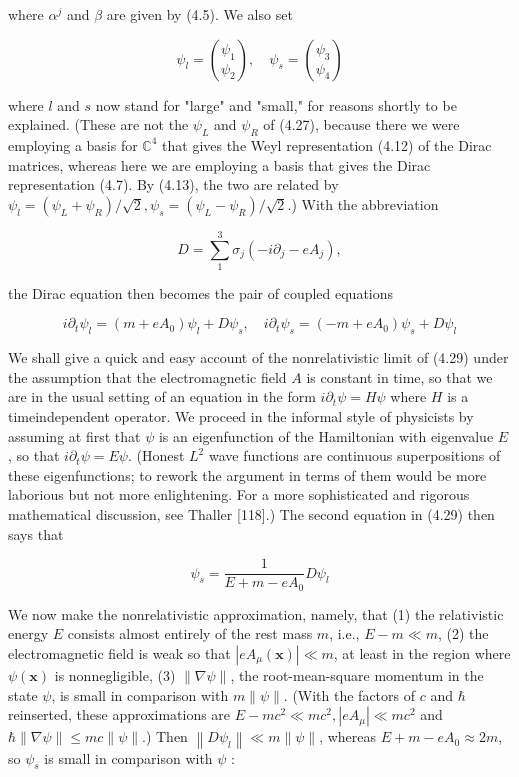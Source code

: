\documentclass[10pt, letterpaper]{article}
\begin{document}
where $\alpha^{j}$ and $\beta$ are given by (4.5). We also set

$$
\psi_{l}=\binom{\psi_{1}}{\psi_{2}}, \quad \psi_{s}=\binom{\psi_{3}}{\psi_{4}}
$$

where $l$ and $s$ now stand for "large" and "small," for reasons shortly to be explained. (These are not the $\psi_{L}$ and $\psi_{R}$ of (4.27), because there we were employing a basis for $\mathbb{C}^{4}$ that gives the Weyl representation (4.12) of the Dirac matrices, whereas here we are employing a basis that gives the Dirac representation (4.7). By (4.13), the two are related by $\psi_{l}=\left(\psi_{L}+\psi_{R}\right) / \sqrt{2}, \psi_{s}=\left(\psi_{L}-\psi_{R}\right) / \sqrt{2}$.) With the abbreviation

$$
D=\sum_{1}^{3} \sigma_{j}\left(-i \partial_{j}-e A_{j}\right),
$$

the Dirac equation then becomes the pair of coupled equations

$$
i \partial_{t} \psi_{l}=\left(m+e A_{0}\right) \psi_{l}+D \psi_{s}, \quad i \partial_{t} \psi_{s}=\left(-m+e A_{0}\right) \psi_{s}+D \psi_{l}
$$

We shall give a quick and easy account of the nonrelativistic limit of (4.29) under the assumption that the electromagnetic field $A$ is constant in time, so that we are in the usual setting of an equation in the form $i \partial_{t} \psi=H \psi$ where $H$ is a timeindependent operator. We proceed in the informal style of physicists by assuming at first that $\psi$ is an eigenfunction of the Hamiltonian with eigenvalue $E$, so that $i \partial_{t} \psi=E \psi$. (Honest $L^{2}$ wave functions are continuous superpositions of these eigenfunctions; to rework the argument in terms of them would be more laborious but not more enlightening. For a more sophisticated and rigorous mathematical discussion, see Thaller [118].) The second equation in (4.29) then says that

$$
\psi_{s}=\frac{1}{E+m-e A_{0}} D \psi_{l}
$$

We now make the nonrelativistic approximation, namely, that (1) the relativistic energy $E$ consists almost entirely of the rest mass $m$, i.e., $E-m \ll m$, (2) the electromagnetic field is weak so that $\left|e A_{\mu}(\mathbf{x})\right| \ll m$, at least in the region where $\psi(\mathbf{x})$ is nonnegligible, (3) $\|\nabla \psi\|$, the root-mean-square momentum in the state $\psi$, is small in comparison with $m\|\psi\|$. (With the factors of $c$ and $\hbar$ reinserted, these approximations are $E-m c^{2} \ll m c^{2},\left|e A_{\mu}\right| \ll m c^{2}$ and $\hbar\|\nabla \psi\| \leq m c\|\psi\|$.) Then $\left\|D \psi_{l}\right\| \ll m\|\psi\|$, whereas $E+m-e A_{0} \approx 2 m$, so $\psi_{s}$ is small in comparison with $\psi$ :
\end{document}
